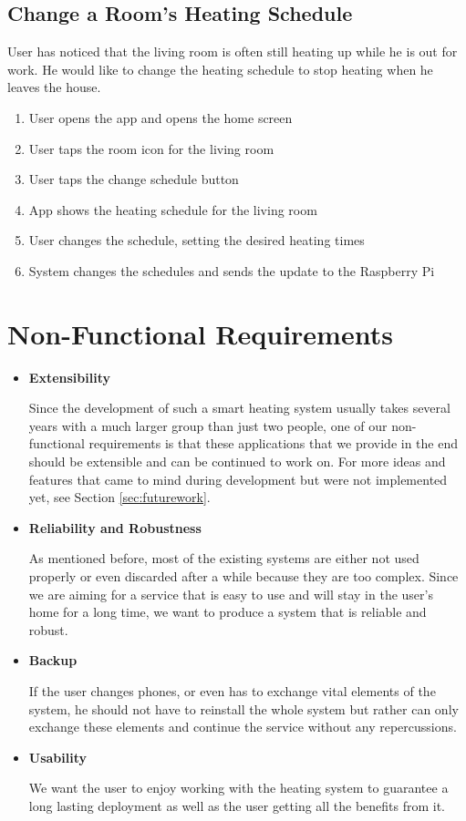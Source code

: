 \subsection{Change a Room's Heating Schedule}
User has noticed that the living room is often still heating up while he is out for work. He would like to change the heating schedule to stop heating when he leaves the house.
\begin{enumerate}
    \item User opens the app and opens the home screen
    \item User taps the room icon for the living room
    \item User taps the change schedule button
    \item App shows the heating schedule for the living room
    \item User changes the schedule, setting the desired heating times
    \item System changes the schedules and sends the update to the Raspberry Pi
\end{enumerate}

\section{Non-Functional Requirements}

\begin{itemize}
    \item \textbf{Extensibility}
    
    Since the development of such a smart heating system usually takes several years with a much larger group than just two people, one of our non-functional requirements is that these applications that we provide in the end should be extensible and can be continued to work on. For more ideas and features that came to mind during development but were not implemented yet, see Section \ref{sec:futurework}.
    \item \textbf{Reliability and Robustness}
    
    As mentioned before, most of the existing systems are either not used properly or even discarded after a while because they are too complex. Since we are aiming for a service that is easy to use and will stay in the user's home for a long time, we want to produce a system that is reliable and robust.
    \item \textbf{Backup}
    
    If the user changes phones, or even has to exchange vital elements of the system, he should not have to reinstall the whole system but rather can only exchange these elements and continue the service without any repercussions.
    
    \item \textbf{Usability}
    
    We want the user to enjoy working with the heating system to guarantee a long lasting deployment as well as the user getting all the benefits from it. 
\end{itemize}




